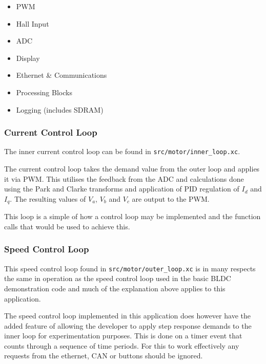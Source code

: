 \begin{itemize}
\item PWM
\item Hall Input
\item ADC
\item Display
\item Ethernet \& Communications
\item Processing Blocks
\item Logging (includes SDRAM)
\end{itemize}

\subsubsection{Current Control Loop}
The inner current control loop can be found in \verb=src/motor/inner_loop.xc=.

The current control loop takes the demand value from the outer loop and applies it via PWM. This utilises the feedback from the ADC and calculations done using the Park and Clarke transforms and application of PID regulation of $I_d$ and $I_q$.  The resulting values of $V_a$, $V_b$ and $V_c$ are output to the PWM.

This loop is a simple of how a control loop may be implemented and the function calls that would be used to achieve this.

\subsubsection{Speed Control Loop}
This speed control loop found in \verb=src/motor/outer_loop.xc= is in many respects the same in operation as the speed control loop used in the basic BLDC demonstration code and much of the explanation above applies to this application. 

The speed control loop implemented in this application does however have the added feature of allowing the developer to apply step response demands to the inner loop for experimentation purposes. This is done on a timer event that counts through a sequence of time periods. For this to work effectively any requests from the ethernet, CAN or buttons should be ignored. 



